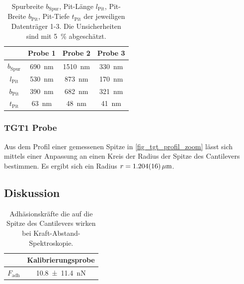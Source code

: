 \documentclass[
	a4paper,
	12pt,
	pagesize,
	ngerman
]{scrartcl}
\begin{document}
\begin{table}[H]
		\centering
		\begin{tabular}{ c | c | c | c }
			 & Probe 1 & Probe 2 & Probe 3\\ \hline
			$b_\text{Spur}$ & \SI{690}{nm} & \SI{1510}{nm} &\SI{330}{nm} \\
			$l_\text{Pit}$ & \SI{530}{nm} & \SI{873}{nm} &\SI{170}{nm} \\
			$b_\text{Pit}$ & \SI{390}{nm} & \SI{682}{nm} &\SI{321}{nm} \\
			$t_\text{Pit}$ & \SI{63}{nm} & \SI{48}{nm} &\SI{41}{nm} \\
		\end{tabular}
		\caption{Spurbreite $b_\text{Spur}$, Pit-Länge $l_\text{Pit}$, Pit-Breite $b_\text{Pit}$, Pit-Tiefe $t_\text{Pit}$ der jeweiligen Datenträger 1-3.
		Die Unsicherheiten sind mit \SI{5}{\%} abgeschätzt.} %
		\label{tb_spur}
	\end{table}

	\subsubsection{TGT1 Probe} %
	Aus dem Profil einer gemessenen Spitze in \cref{fig_tgt_profil_zoom} lässt sich mittels einer Anpassung an einen Kreis der Radius der Spitze des Cantilevers bestimmen. %
	Es ergibt sich ein Radius $r=\SI{1.204 +-0.016}{\mu m}$.

	\subsection{Diskussion}

\begin{table}[H]
		\centering
		\begin{tabular}{ c | c }
			 & Kalibrierungsprobe\\ \hline
			$F_\text{adh}$ & \SI{10.8+-11.4}{nN} \\
		\end{tabular}
		\caption{Adhäsionskräfte die auf die Spitze des Cantilevers wirken bei Kraft-Abstand-Spektroskopie.} %
		\label{tb_ds}
	\end{table}
\end{document}
